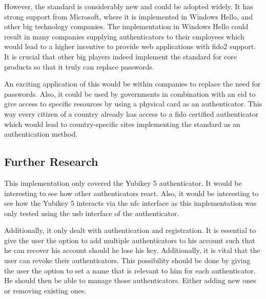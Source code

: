 \documentclass[a4paper, 11pt]{scrartcl}
\begin{document}
However, the standard is considerably new and could be adopted widely. It has strong support from Microsoft, where it is implemented in Windows Hello, and other big technology companies. The implementation in Windows Hello could result in many companies supplying authenticators to their employees which would lead to a higher incentive to provide web applications with \gls{fido2} support. It is crucial that other big players indeed implement the standard for core products so that it truly can replace passwords.

An exciting application of this would be within companies to replace the need for passwords. Also, it could be used by governments in combination with an \gls{eid} to give access to specific resources by using a physical card as an authenticator. This way every citizen of a country already has access to a \gls{fido} certified authenticator which would lead to country-specific sites implementing the standard as an authentication method. 

\subsection{Further Research}

This implementation only covered the Yubikey 5 authenticator. It would be interesting to see how other authenticators react. Also, it would be interesting to see how the Yubikey 5 interacts via the \gls{nfc} interface as this implementation was only tested using the \gls{usb} interface of the authenticator. 

Additionally, it only dealt with authentication and registration. It is essential to give the user the option to add multiple authenticators to his account such that he can recover his account should he lose his key. Additionally, it is vital that the user can revoke their authenticators. This possibility should be done by giving the user the option to set a name that is relevant to him for each authenticator. He should then be able to manage those authenticators. Either adding new ones or removing existing ones. 


\clearpage

\printglossaries

\clearpage

\printbibliography[heading=bibintoc]
\end{document}
